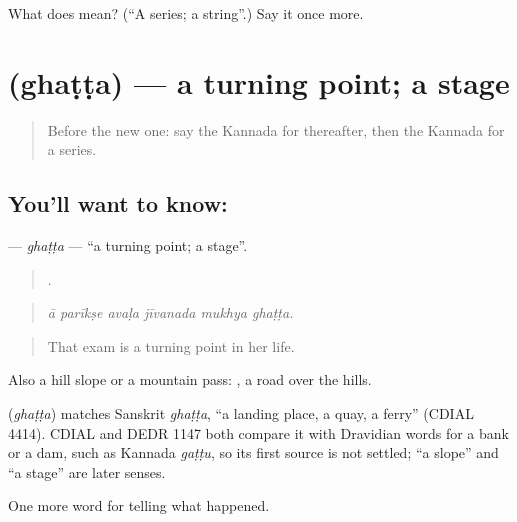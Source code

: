 \begin{tcolorbox}[breakable,colback=teal!4,colframe=teal!35!black,title={Before you move on}]
What does  mean? (\textquotedblleft{}A series; a string\textquotedblright{}.) Say it once more.
\end{tcolorbox}
\section[\texorpdfstring{\kn{ಘಟ್ಟ} (ghaṭṭa)}{ಘಟ್ಟ (ghaṭṭa)}]{ (ghaṭṭa) — a turning point; a stage}

\label{lesson:KA-C368-ghatta}



\begin{quote}
Before the new one: say the Kannada for thereafter, then the Kannada for a series.
\end{quote}

\subsection*{You'll want to know: }
\textbf{} — \emph{ghaṭṭa} — \textquotedblleft{}a turning point; a stage\textquotedblright{}.

\begin{quote}
     .
\end{quote}

\begin{quote}
\emph{ā parīkṣe avaḷa jīvanada mukhya ghaṭṭa.}
\end{quote}

\begin{quote}
That exam is a turning point in her life.
\end{quote}

Also a hill slope or a mountain pass:  , a road over the hills.

\begin{cousinweb}
\textbf{} (\emph{ghaṭṭa}) matches Sanskrit \emph{ghaṭṭa}, \textquotedblleft{}a landing place, a quay, a ferry\textquotedblright{} (CDIAL 4414). CDIAL and DEDR 1147 both compare it with Dravidian words for a bank or a dam, such as Kannada \emph{gaṭṭu}, so its first source is not settled; \textquotedblleft{}a slope\textquotedblright{} and \textquotedblleft{}a stage\textquotedblright{} are later senses.
\end{cousinweb}

\begin{grammarlens}[title={What you've built}]
One more word for telling what happened.
\end{grammarlens}

